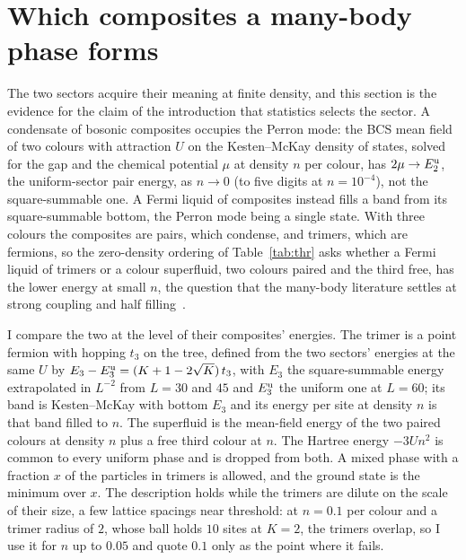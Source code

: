 \documentclass[aps,pre,twocolumn,superscriptaddress,floatfix]{revtex4-2}
\begin{document}
\section{Which composites a many-body phase forms}
\label{sec:density}
The two sectors acquire their meaning at finite density, and this section
is the evidence for the claim of the introduction that statistics selects
the sector. A condensate of bosonic composites occupies the Perron mode: the BCS mean field of two
colours with attraction $U$ on the Kesten--McKay density of states, solved
for the gap and the chemical potential $\mu$ at density $n$ per colour, has
$2\mu\to E_{2}^{\rm u}$, the uniform-sector pair energy, as $n\to0$ (to
five digits at $n=10^{-4}$), not the square-summable one. A Fermi liquid
of composites instead fills a band from its square-summable bottom, the
Perron mode being a single state. With three colours the composites are
pairs, which condense, and trimers, which are fermions, so the
zero-density ordering of Table~\ref{tab:thr} asks whether a Fermi liquid
of trimers or a colour superfluid, two colours paired and the third free,
has the lower energy at small $n$, the question that the many-body
literature settles at strong coupling and half
filling~\cite{rapp2007,inaba2011}.

I compare the two at the level of their composites' energies. The trimer is
a point fermion with hopping $t_{3}$ on the tree, defined from the two
sectors' energies at the same $U$ by
$E_{3}-E_{3}^{\rm u}=(K+1-2\sqrt{K})\,t_{3}$, with $E_{3}$ the
square-summable energy extrapolated in $L^{-2}$ from $L=30$ and $45$ and
$E_{3}^{\rm u}$ the uniform one at $L=60$; its band is Kesten--McKay with
bottom $E_{3}$ and its energy per site at density $n$ is that band filled
to $n$. The superfluid is the mean-field energy of the two paired colours
at density $n$ plus a free third colour at $n$. The Hartree energy
$-3Un^{2}$ is common to every uniform phase and is dropped from both. A
mixed phase with a fraction $x$ of the particles in trimers is allowed, and
the ground state is the minimum over $x$. The description holds while the trimers are dilute on the scale of
their size, a few lattice spacings near threshold: at $n=0.1$ per colour
and a trimer radius of $2$, whose ball holds $10$ sites at $K=2$, the
trimers overlap, so I use it for $n$ up to $0.05$ and quote $0.1$ only
as the point where it fails.
\end{document}
